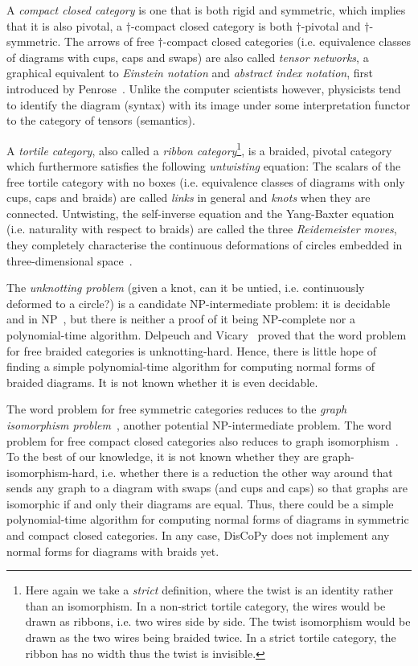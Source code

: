 A \emph{compact closed category} is one that is both rigid and symmetric, which implies that it is also pivotal, a $\dagger$-compact closed category is both $\dagger$-pivotal and $\dagger$-symmetric.
The arrows of free $\dagger$-compact closed categories (i.e. equivalence classes of diagrams with cups, caps and swaps) are also called \emph{tensor networks}, a graphical equivalent to \emph{Einstein notation} and \emph{abstract index notation}, first introduced by Penrose~\cite{Penrose71}.
Unlike the computer scientists however, physicists tend to identify the diagram (syntax) with its image under some interpretation functor to the category of tensors (semantics).

A \emph{tortile category}, also called a \emph{ribbon category}\footnote
{Here again we take a \emph{strict} definition, where the twist is an identity rather than an isomorphism.
In a non-strict tortile category, the wires would be drawn as ribbons, i.e. two wires side by side.
The twist isomorphism would be drawn as the two wires being braided twice.
In a strict tortile category, the ribbon has no width thus the twist is invisible.},
is a braided, pivotal category which furthermore satisfies the following \emph{untwisting} equation:
The scalars of the free tortile category with no boxes (i.e. equivalence classes of diagrams with only cups, caps and braids) are called \emph{links} in general and \emph{knots} when they are connected.
Untwisting, the self-inverse equation and the Yang-Baxter equation (i.e. naturality with respect to braids) are called the three \emph{Reidemeister moves}, they completely characterise the continuous deformations of circles embedded in three-dimensional space~\cite{Reidemeister13}.

The \emph{unknotting problem} (given a knot, can it be untied, i.e. continuously deformed to a circle?) is a candidate NP-intermediate problem: it is decidable~\cite{Haken61} and in NP~\cite{Lackenby15}, but there is neither a proof of it being NP-complete nor a polynomial-time algorithm.
Delpeuch and Vicary~\cite{DelpeuchVicary21} proved that the word problem for free braided categories is unknotting-hard.
Hence, there is little hope of finding a simple polynomial-time algorithm for computing normal forms of braided diagrams.
It is not known whether it is even decidable.

The word problem for free symmetric categories reduces to the \emph{graph isomorphism problem}~\cite{PattersonEtAl21}, another potential NP-intermediate problem.
The word problem for free compact closed categories also reduces to graph isomorphism~\cite{Selinger07}.
To the best of our knowledge, it is not known whether they are graph-isomorphism-hard, i.e. whether there is a reduction the other way around that sends any graph to a diagram with swaps (and cups and caps) so that graphs are isomorphic if and only their diagrams are equal.
Thus, there could be a simple polynomial-time algorithm for computing normal forms of diagrams in symmetric and compact closed categories.
In any case, DisCoPy does not implement any normal forms for diagrams with braids yet.

